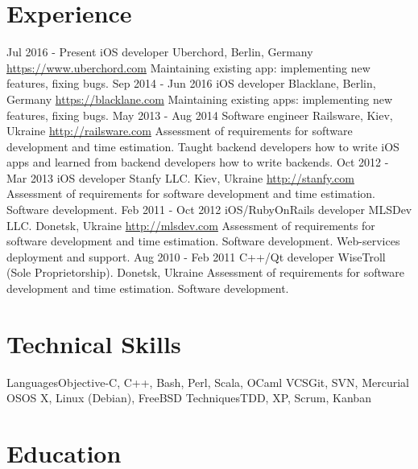\documentclass[11pt,a4paper]{moderncv}
\begin{document}
\section{Experience}
\cventry
  {Jul 2016 - Present}
  {iOS developer}
  {Uberchord, Berlin, Germany}
  {\newline{}\url{https://www.uberchord.com}}{}
  {Maintaining existing app: implementing new features, fixing bugs.}
\cventry
  {Sep 2014 - Jun 2016}
  {iOS developer}
  {Blacklane, Berlin, Germany}
  {\newline{}\url{https://blacklane.com}}{}
  {Maintaining existing apps: implementing new features, fixing bugs.}
\cventry
  {May 2013 - Aug 2014}
  {Software engineer}
  {Railsware, Kiev, Ukraine}
  {\newline{}\url{http://railsware.com}}{}
  {Assessment of requirements for software development and time estimation.\newline{}
  Taught backend developers how to write iOS apps and learned from backend developers how to write backends.}
\cventry
  {Oct 2012 - Mar 2013}
  {iOS developer}
  {Stanfy LLC. Kiev, Ukraine}
  {\newline{}\url{http://stanfy.com}}{}
  {Assessment of requirements for software development and time estimation.
  \newline{}Software development.}
\cventry
  {Feb 2011 - Oct 2012}
  {iOS/RubyOnRails developer}
  {MLSDev LLC. Donetsk, Ukraine}
  {\newline{}\url{http://mlsdev.com}}{}
  {Assessment of requirements for software development and time estimation.\newline{}
  Software development. Web-services deployment and support.}
\cventry
  {Aug 2010 - Feb 2011}
  {C++/Qt developer}
  {WiseTroll (Sole Proprietorship). Donetsk, Ukraine}
  {}{}
  {Assessment of requirements for software development and time estimation.
  \newline{}Software development.}

\section{Technical Skills}
\cvline
  {Languages}{Objective-C, C++, Bash, Perl, Scala, OCaml}
\cvline
  {VCS}{Git, SVN, Mercurial}
\cvline
  {OS}{OS X, Linux (Debian), FreeBSD}
\cvline
  {Techniques}{TDD, XP, Scrum, Kanban}

\section{Education}
\end{document}
